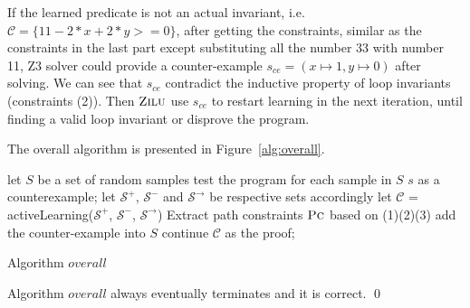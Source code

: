 If the learned predicate is not an actual invariant, i.e. $\mathcal{C} = \{11-2*x+2*y>=0\}$,
after getting the constraints, similar as the constraints in the last part except substituting all the number 33 with number 11, 
Z3 solver could provide a counter-example $s_{ce} = (x \mapsto 1, y \mapsto 0)$ after solving.
We can see that $s_{ce}$ contradict the inductive property of loop invariants (constraints (2)).
Then $\textsc{Zilu}$ use $s_{ce}$ to restart learning in the next iteration, until finding a valid loop invariant or disprove the program.


 
The overall algorithm is presented in Figure~\ref{alg:overall}.
\begin{algorithm}[!h]
\SetAlgoVlined
\Indm
{}
\Indp
let $S$ be a set of random samples\;
 {
    test the program for each sample in $S$\;
     {
        \Return $s$ as a counterexample;
    }
    let $\mathcal{S}^+$, $\mathcal{S}^-$ and $\mathcal{S}^\rightarrow$ be respective sets accordingly\;
    let $\mathcal{C}$ = activeLearning($\mathcal{S}^+$, $\mathcal{S}^-$, $\mathcal{S}^\rightarrow$)\;
    Extract path constraints $\textsc{Pc}$ based on (1)(2)(3)\;
     {
         {
            add the counter-example into $S$\;
            continue\;
        }
    }
    \Return $\mathcal{C}$ as the proof;
}
\caption{Algorithm $overall$}
\label{alg:overall}
\end{algorithm}




\begin{theorem}
Algorithm $overall$ always eventually terminates and it is correct. \hfill \qed
\end{theorem}


